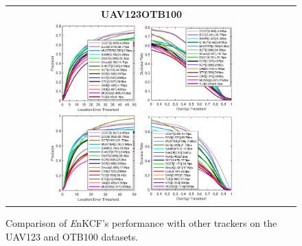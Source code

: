\documentclass[10pt,twocolumn,letterpaper]{article}
\begin{document}
\begin{figure}[h]
\centering
\begin{tabular}{ccc}
\tiny\quad\textbf{UAV123}\hspace{.37\linewidth}\textbf{OTB100}\\
\includegraphics[width=3.30cm]{./figures/pr_uav123.eps}
\includegraphics[width=3.55cm]{./figures/sr_uav123.eps}
\includegraphics[width=3.30cm]{./figures/pr_otb100.eps}
\includegraphics[width=3.55cm]{./figures/sr_otb100.eps}\\
\end{tabular}
\caption{Comparison of {\it E}nKCF's performance with other trackers on the UAV123 and OTB100 datasets.}
\label{fig:UAV123_DATASET}
\end{figure}

\end{document}
